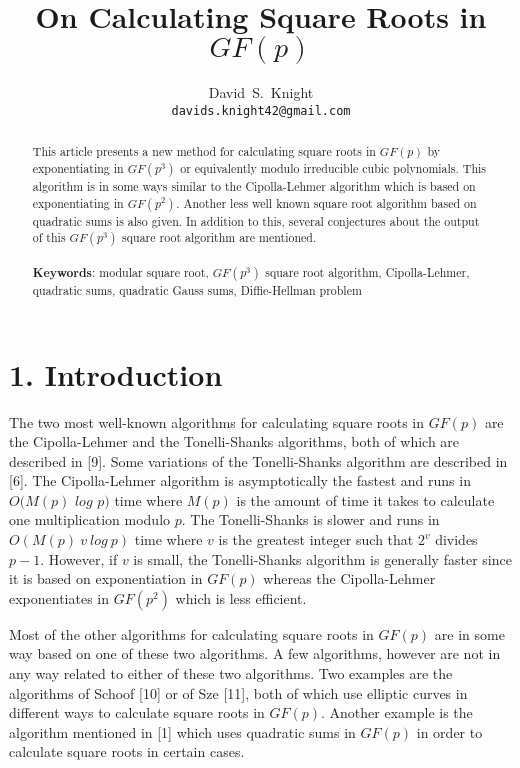 \documentclass[final,letterpaper,oneside,10pt]{article}
\author{David~S.~Knight \\  \texttt{davids.knight42@gmail.com}}
\date{}
\title{On Calculating Square Roots in $GF(p)$}
\begin{document}
\maketitle



\begin {abstract} 
This article presents a new method for calculating square roots in $GF(p)$
by exponentiating in $GF(p^3)$ or equivalently modulo irreducible cubic polynomials.  This algorithm
is in some ways similar to the Cipolla-Lehmer algorithm which is based on exponentiating in $GF(p^2)$.
Another less well known square root algorithm based on quadratic sums is also given.  In addition to this,
several conjectures about the output of this $GF(p^3)$ square root algorithm are mentioned.
\\
\\
\textbf{Keywords}: modular square root, $GF(p^3)$ square root algorithm,
Cipolla-Lehmer, quadratic sums, quadratic Gauss sums, Diffie-Hellman problem

\end{abstract}


\section*{1. Introduction}
The two most well-known algorithms for calculating square roots in $GF(p)$ are the Cipolla-Lehmer and the 
Tonelli-Shanks algorithms, both of which are described in [9].  Some variations of the Tonelli-Shanks algorithm
are described in [6].  The Cipolla-Lehmer algorithm is asymptotically the fastest and runs in $O(M(p)$ $log$  $p)$ time
where $M(p)$ is the amount of time it takes to calculate one multiplication modulo $p$.  The Tonelli-Shanks is slower 
and runs in $O(M(p)~v~log~p)$ time where $v$ is the greatest integer such that $2^v$ divides $p-1$.
However, if $v$ is small, the Tonelli-Shanks algorithm is generally faster since it is based on exponentiation in $GF(p)$
whereas the Cipolla-Lehmer exponentiates in $GF(p^2)$ which is less efficient.

Most of the other algorithms for calculating square roots in $GF(p)$ are in some way based on one of these two 
algorithms.  A few algorithms, however are not in any way related to either of these two algorithms.  Two examples 
are the algorithms of Schoof [10] or of Sze [11], both of which use elliptic curves in different ways to calculate square
roots in $GF(p)$.  Another example is the algorithm mentioned in [1] which uses quadratic sums in $GF(p)$
in order to calculate square roots in certain cases.
\end{document}
